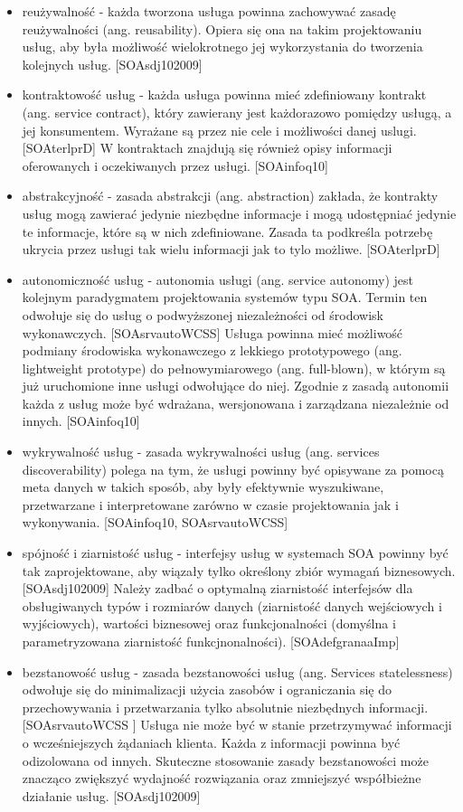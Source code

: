 \begin{itemize}
\item{reużywalność - każda tworzona usługa powinna zachowywać zasadę reużywalności (ang. reusability).  Opiera się ona na takim projektowaniu usług, aby była możliwość wielokrotnego jej wykorzystania do tworzenia kolejnych usług. [SOAsdj102009]}
\item{kontraktowość usług - każda usługa powinna mieć zdefiniowany kontrakt (ang. service contract), który zawierany jest każdorazowo pomiędzy usługą, a jej konsumentem. Wyrażane są przez nie cele i możliwości danej uslugi. [SOAterlprD] W kontraktach znajdują się również opisy informacji oferowanych  i oczekiwanych przez usługi. [SOAinfoq10]}
\item{abstrakcyjność - zasada abstrakcji (ang. abstraction) zakłada, że kontrakty usług mogą zawierać jedynie niezbędne informacje i mogą udostępniać jedynie te informacje, które są w nich zdefiniowane. Zasada ta podkreśla potrzebę ukrycia przez usługi tak wielu informacji jak to tylo możliwe. [SOAterlprD]}
\item{autonomiczność usług - autonomia usługi (ang. service autonomy) jest kolejnym paradygmatem projektowania systemów typu SOA. Termin ten odwołuje się do usług o podwyższonej niezależności od środowisk wykonawczych. [SOAsrvautoWCSS] Usługa powinna mieć możliwość podmiany środowiska wykonawczego z lekkiego prototypowego (ang. lightweight prototype) do pełnowymiarowego (ang. full-blown), w którym są już uruchomione inne usługi odwołujące do niej. Zgodnie z zasadą autonomii każda z usług może być wdrażana, wersjonowana i zarządzana niezależnie od innych. [SOAinfoq10]}
\item{wykrywalność usług - zasada wykrywalności usług (ang. services discoverability) polega na tym, że usługi powinny być opisywane za pomocą meta danych w takich sposób, aby były efektywnie wyszukiwane, przetwarzane i interpretowane zarówno w czasie projektowania jak i wykonywania. [SOAinfoq10, SOAsrvautoWCSS]}
\item{spójność i ziarnistość usług - interfejsy usług w systemach SOA powinny być tak zaprojektowane, aby wiązały tylko określony zbiór wymagań biznesowych. [SOAsdj102009] Należy zadbać o optymalną ziarnistość interfejsów dla obsługiwanych typów i rozmiarów danych (ziarnistość danych wejściowych i wyjściowych), wartości biznesowej oraz funkcjonalności (domyślna i parametryzowana ziarnistość funkcjnonalności). [SOAdefgranaaImp]}
\item{bezstanowość usług - zasada bezstanowości usług (ang. Services statelessness) odwołuje się do minimalizacji użycia zasobów i ograniczania się do przechowywania i przetwarzania tylko absolutnie niezbędnych informacji.  [SOAsrvautoWCSS ] Usługa nie może być w stanie przetrzymywać informacji o wcześniejszych żądaniach klienta. Każda z informacji powinna być odizolowana od innych. Skuteczne stosowanie zasady bezstanowości może znacząco zwiększyć wydajność rozwiązania oraz zmniejszyć współbieżne działanie usług. [SOAsdj102009]}

\end{itemize}
